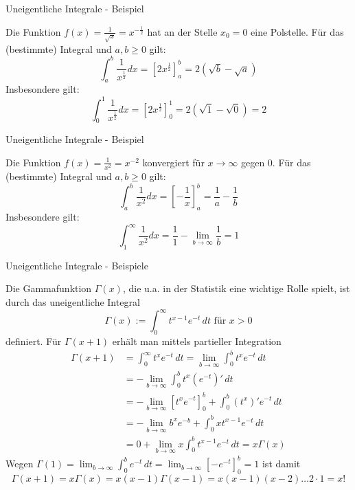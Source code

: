 \begin{frame}{Uneigentliche Integrale - Beispiel}	
	\begin{example}
		Die Funktion $f(x)=\frac{1}{\sqrt{x}}=x^{-\frac{1}{2}}$ hat an der Stelle $x_{0}=0$ eine Polstelle.
		Für das (bestimmte) Integral und $a, b \geq 0$ gilt:
		\[
			\int_{a}^{b} \frac{1}{x^{\frac{1}{2}}} dx = [ 2 x^{\frac{1}{2}} ]_{a}^{b} = 2 ( \sqrt{b} - \sqrt{a} )
		\]	
		Insbesondere gilt:
		\[
			\int_{0}^{1} \frac{1}{x^{\frac{1}{2}}} dx = [ 2 x^{\frac{1}{2}} ]_{0}^{1} = 2 ( \sqrt{1} - \sqrt{0} ) = 2
		\]
	\end{example}
\end{frame}

\begin{frame}{Uneigentliche Integrale - Beispiel}	
	\begin{example}
		Die Funktion $f(x)=\frac{1}{x^{2}}=x^{-2}$ konvergiert für $x \to \infty$ gegen $0$.
		Für das (bestimmte) Integral und $a, b \geq 0$ gilt:
		\[
			\int_{a}^{b} \frac{1}{x^2} dx = [ - \frac{1}{x} ]_{a}^{b} =  \frac{1}{a} - \frac{1}{b}
		\]	
		Insbesondere gilt:
		\[
			\int_{1}^{\infty} \frac{1}{x^{2}} dx = \frac{1}{1} - \lim_{b \to \infty}\frac{1}{b} = 1
		\]
	\end{example}
\end{frame}

\begin{frame}{Uneigentliche Integrale - Beispiele}
\begin{example}
\scriptsize{	Die Gammafunktion $\Gamma (x)$, die u.a. in der Statistik eine wichtige Rolle spielt, ist durch das uneigentliche Integral 
	\[
		\Gamma (x) := \int_{0}^{\infty} t^{x-1}e^{-t}\,dt \text{ für } x > 0 
	\]
	definiert.
	Für $\Gamma (x+1)$ erhält man mittels partieller Integration
	\begin{align*}
		\Gamma (x+1) & = \int_{0}^{\infty} t^{x}e^{-t}\, dt = \lim_{b \to \infty} \int_{0}^{b} t^{x}e^{-t}\, dt \\
		& = - \lim_{b \to \infty} \int_{0}^{b} t^{x}(e^{-t})' \, dt \\
		&= - \lim_{b \to \infty} [t^{x}e^{-t}]_{0}^{b} + \int_{0}^{b} (t^{x})' e^{-t}\, dt \\
		&= - \lim_{b \to \infty} b^{x}e^{-b} + \int_{0}^{b} xt^{x-1} e^{-t}\, dt \\
		&= 0 + \lim_{b \to \infty} x\int_{0}^{b} t^{x-1} e^{-t}\, dt = x\Gamma (x)
	\end{align*}
	Wegen $\Gamma (1)=\lim_{b \to \infty} \int_{0}^{b} e^{-t}\,dt = \lim_{b \to \infty} [-e^{-t}]_{0}^{b} = 1$ ist damit 
	\[
	\Gamma (x+1) = x \Gamma (x) = x (x-1) \Gamma(x-1) = x (x-1) (x-2) \ldots 2 \cdot 1 = x!
	\]}
\end{example}
\end{frame}


